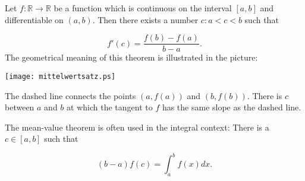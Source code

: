 \documentclass{article}
\newcommand{\reals}{\mathbb{R}}
\begin{document}
Let $f:\reals \to \reals$ be a function which is continuous on the interval $[a,b]$ and differentiable on $(a,b)$.  Then there exists a number $c: a < c < b$ such that

\begin{equation}
f'(c) = \frac{f(b) - f(a)}{b - a}.
\end{equation}
The geometrical meaning of this theorem is illustrated in the picture:\\[10pt]
\begin{center}
\texttt{[image: mittelwertsatz.ps]}
\end{center}
The dashed line connects the points $(a,f(a))$ and $(b,f(b))$. There is $c$ between $a$ and $b$ at which the tangent to $f$ has the same slope as the dashed line.

The mean-value theorem is often used in the integral context: There is a $c \in [a,b]$ such that

\begin{equation}
(b-a)f(c) = \int_{a}^{b} f(x) dx.
\end{equation}
\end{document}
